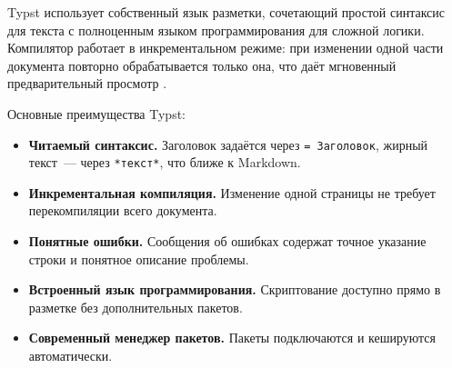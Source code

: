 Typst использует собственный язык разметки, сочетающий простой синтаксис для текста с полноценным языком программирования для сложной логики. Компилятор работает в инкрементальном режиме: при изменении одной части документа повторно обрабатывается только она, что даёт мгновенный предварительный просмотр \cite{typst-docs}.

Основные преимущества Typst:
\begin{itemize}
    \item \textbf{Читаемый синтаксис.} Заголовок задаётся через \texttt{=~Заголовок}, жирный текст~--- через \texttt{*текст*}, что ближе к Markdown.
    \item \textbf{Инкрементальная компиляция.} Изменение одной страницы не требует перекомпиляции всего документа.
    \item \textbf{Понятные ошибки.} Сообщения об ошибках содержат точное указание строки и понятное описание проблемы.
    \item \textbf{Встроенный язык программирования.} Скриптование доступно прямо в разметке без дополнительных пакетов.
    \item \textbf{Современный менеджер пакетов.} Пакеты подключаются и кешируются автоматически.
\end{itemize}
